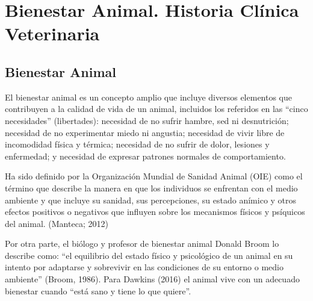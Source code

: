 \chapter{Bienestar Animal. Historia Clínica Veterinaria}\label{chapter:animalHealth}

\section{Bienestar Animal}
El bienestar animal es un concepto amplio que incluye diversos elementos que contribuyen a la calidad de vida de un animal, incluidos los referidos en las “cinco necesidades” (libertades): necesidad de no sufrir hambre, sed ni desnutrición; necesidad de no
experimentar miedo ni angustia; necesidad de vivir libre de incomodidad física y térmica; necesidad de no sufrir de dolor, lesiones y enfermedad; y necesidad de expresar patrones normales de comportamiento.


Ha sido definido por la Organización Mundial de Sanidad Animal (OIE) como el término que describe la manera en que los individuos se enfrentan con el medio ambiente y que incluye su sanidad, sus percepciones, su estado anímico y otros efectos positivos o negativos que influyen sobre los mecanismos físicos y psíquicos del animal.
(Manteca; 2012)


Por otra parte, el biólogo y profesor de bienestar animal Donald Broom lo describe como: “el equilibrio del estado físico y psicológico de un animal en su intento por adaptarse y sobrevivir en las condiciones de su entorno o medio ambiente” (Broom, 1986). Para Dawkins (2016) el animal vive con un adecuado bienestar cuando “está sano y tiene lo que quiere”.


